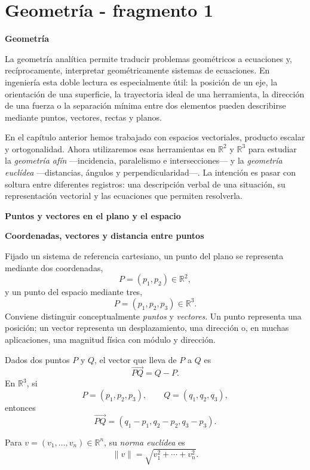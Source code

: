 
\section{Geometría - fragmento 1}
\textbf{Geometría}

La geometría analítica permite traducir problemas geométricos a ecuaciones y, recíprocamente, interpretar geométricamente sistemas de ecuaciones. En ingeniería esta doble lectura es especialmente útil: la posición de un eje, la orientación de una superficie, la trayectoria ideal de una herramienta, la dirección de una fuerza o la separación mínima entre dos elementos pueden describirse mediante puntos, vectores, rectas y planos.

En el capítulo anterior hemos trabajado con espacios vectoriales, producto escalar y ortogonalidad. Ahora utilizaremos esas herramientas en $\mathbb{R}^2$ y $\mathbb{R}^3$ para estudiar la \emph{geometría afín} ---incidencia, paralelismo e intersecciones--- y la \emph{geometría euclídea} ---distancias, ángulos y perpendicularidad---. La intención es pasar con soltura entre diferentes registros: una descripción verbal de una situación, su representación vectorial y las ecuaciones que permiten resolverla.

\textbf{Puntos y vectores en el plano y el espacio}

\textbf{Coordenadas, vectores y distancia entre puntos}

Fijado un sistema de referencia cartesiano, un punto del plano se representa mediante dos coordenadas,
\[
P=(p_1,p_2)\in\mathbb{R}^2,
\]
y un punto del espacio mediante tres,
\[
P=(p_1,p_2,p_3)\in\mathbb{R}^3.
\]
Conviene distinguir conceptualmente \emph{puntos} y \emph{vectores}. Un punto representa una posición; un vector representa un desplazamiento, una dirección o, en muchas aplicaciones, una magnitud física con módulo y dirección.

Dados dos puntos $P$ y $Q$, el vector que lleva de $P$ a $Q$ es
\[
\overrightarrow{PQ}=Q-P.
\]
En $\mathbb{R}^3$, si
\[
P=(p_1,p_2,p_3),\qquad Q=(q_1,q_2,q_3),
\]
entonces
\[
\overrightarrow{PQ}
=(q_1-p_1,q_2-p_2,q_3-p_3).
\]

\begin{definition}
Para $v=(v_1,\ldots,v_n)\in\mathbb{R}^n$, su \emph{norma euclídea} es
\[
\|v\|=\sqrt{v_1^2+\cdots+v_n^2}.
\]
\end{definition}


